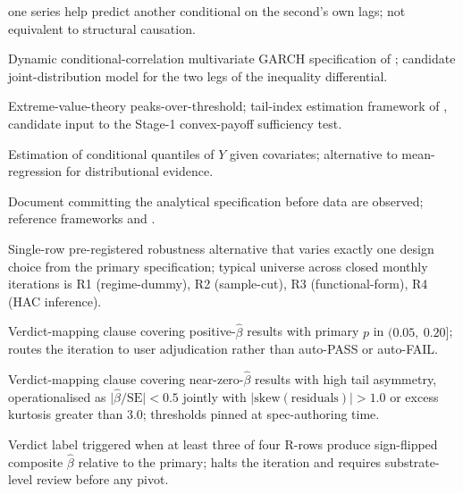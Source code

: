 \begin{description}
    one series help predict another conditional on the second's own
    lags; not equivalent to structural causation.
  \item[DCC-MGARCH] Dynamic conditional-correlation multivariate GARCH
    specification of \citet{engle_2002}; candidate joint-distribution
    model for the two legs of the inequality differential.
  \item[EVT POT] Extreme-value-theory peaks-over-threshold; tail-index
    estimation framework of
    \citet{embrechts_kluppelberg_mikosch_1997}, candidate input to the
    Stage-1 convex-payoff sufficiency test.
  \item[Quantile regression] Estimation of conditional quantiles of \(Y\)
    given covariates; alternative to mean-regression for distributional
    evidence.
  \item[Pre-analysis plan] Document committing the analytical
    specification before data are observed; reference frameworks
    \citet{olken_2015} and \citet{christensen_miguel_2018}.
  \item[R-row] Single-row pre-registered robustness alternative that
    varies exactly one design choice from the primary specification;
    typical universe across closed monthly iterations is R1
    (regime-dummy), R2 (sample-cut), R3 (functional-form), R4 (HAC
    inference).
  \item[ESCALATE Clause A] Verdict-mapping clause covering
    positive-\(\hat{\beta}\) results with primary \(p\) in
    \((0.05,\ 0.20]\); routes the iteration to user adjudication rather
    than auto-PASS or auto-FAIL.
  \item[ESCALATE Clause B] Verdict-mapping clause covering
    near-zero-\(\hat{\beta}\) results with high tail asymmetry,
    operationalised as
    \(\big|\hat{\beta}/\mathrm{SE}\big| < 0.5\) jointly with
    \(\big|\mathrm{skew}(\text{residuals})\big| > 1.0\) or
    excess kurtosis greater than \(3.0\); thresholds pinned at
    spec-authoring time.
  \item[\texttt{SUBSTRATE\_TOO\_NOISY}] Verdict label triggered when at
    least three of four R-rows produce sign-flipped composite
    \(\hat{\beta}\) relative to the primary; halts the iteration and
    requires substrate-level review before any pivot.
\end{description}

